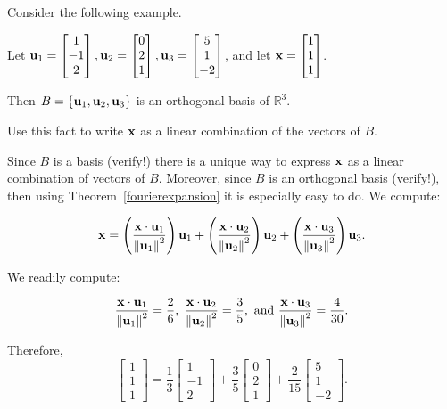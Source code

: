 \documentclass{ximera}
\begin{document}
Consider the following example.

\begin{example}\label{fourier}
Let
${\bf u}_1= \begin{bmatrix}
1 \\ -1 \\ 2
\end{bmatrix},
{\bf u}_2= \begin{bmatrix}
0 \\ 2 \\ 1 
\end{bmatrix},
{\bf u}_3 =\begin{bmatrix}
5 \\ 1 \\ -2
\end{bmatrix}$,
and let
${\bf x} =\begin{bmatrix}
1 \\ 1 \\ 1
\end{bmatrix}$.  

Then $B=\{ {\bf u}_1, {\bf u}_2, {\bf u}_3\}$
is an orthogonal basis of $\mathbb{R}^3$.

Use this fact to write ${\bf x}$ as  a linear combination of the vectors of $B$.

\begin{explanation}
Since $B$ is a basis (verify!) there is a unique way to express ${\bf x}$ as a
linear combination of vectors of $B$. Moreover, since $B$ is an
orthogonal basis (verify!), then using Theorem~\ref{fourierexpansion} it is especially easy to do.  We compute:

\[
{\bf x}   =
\left(\frac{{\bf x}\cdot {\bf u}_1}{\left\lVert{\bf u}_1\right\rVert^2}\right) {\bf u}_1 +
\left(\frac{{\bf x}\cdot {\bf u}_2}{\left\lVert{\bf u}_2\right\rVert^2}\right) {\bf u}_2 +
\left(\frac{{\bf x}\cdot {\bf u}_3}{\left\lVert{\bf u}_3\right\rVert^2}\right) {\bf u}_3.
\]

We readily compute:

\[
\frac{{\bf x}\cdot{\bf u}_1}{\left\lVert{\bf u}_1\right\rVert^2} = \frac{2}{6}, \;
\frac{{\bf x}\cdot{\bf u}_2}{\left\lVert{\bf u}_2\right\rVert^2} = \frac{3}{5},
\mbox{ and }
\frac{{\bf x}\cdot{\bf u}_3}{\left\lVert{\bf u}_3\right\rVert^2} = \frac{4}{30}.\]

Therefore,
\[ \begin{bmatrix}
1 \\ 1 \\ 1
\end{bmatrix}
= \frac{1}{3}\begin{bmatrix}
1 \\ -1 \\ 2
\end{bmatrix}
+\frac{3}{5}\begin{bmatrix}
0 \\ 2 \\ 1
\end{bmatrix}
+\frac{2}{15}\begin{bmatrix}
5 \\ 1 \\ -2
\end{bmatrix}.\]
\end{explanation} 
\end{example}
\end{document}
